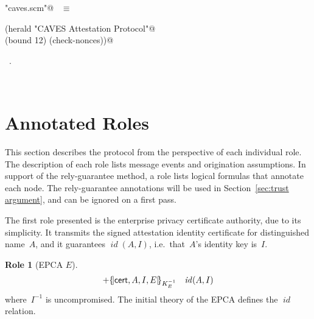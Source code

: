 \documentclass[titlepage,12pt]{article}
\theoremstyle{definition}
\newtheorem{role}{Role}
\newcommand{\outbnd}{\mathord +}
\DeclareMathOperator{\id}{\mathit{id}}
\begin{document}
\begin{flushleft} \small
\begin{minipage}{\linewidth} \label{scrap13}
\verb@"caves.scm"@\nobreak\ {\footnotesize {} }$\equiv$
\vspace{-1ex}
\begin{list}{}{} \item
\mbox{}\verb@(herald "CAVES Attestation Protocol"@\\
\mbox{}\verb@  (bound 12) (check-nonces))@{\NWsep}
\end{list}
\vspace{-1ex}
\footnotesize\addtolength{\baselineskip}{-1ex}
\begin{list}{}{\setlength{\itemsep}{-\parsep}\setlength{\itemindent}{-\leftmargin}}
\item \NWtxtFileDefBy\ .
\end{list}
\end{minipage}\\[4ex]
\end{flushleft}
\section{Annotated Roles}\label{sec:roles}

This section describes the protocol from the perspective of each
individual role.  The description of each role lists message events
and origination assumptions.  In support of the rely-guarantee method,
a role lists logical formulas that annotate each node.
The rely-guarantee annotations will be used in
Section~\ref{sec:trust argument}, and can be ignored on a first pass.

The first role presented is the enterprise privacy certificate
authority, due to its simplicity.  It transmits the signed attestation
identity certificate for distinguished name~$A$, and it
guarantees $\id(A,I)$, i.e.\ that~$A$'s identity key is~$I$.

\begin{role}[EPCA $E$]
\begin{eqnarray}
&\outbnd\ptova&\id(A,I)\label{eq:epca 1}
\end{eqnarray}
where~$I^{-1}$ is uncompromised.  The initial theory of the EPCA
defines the $\id$ relation.
\end{role}
\end{document}
